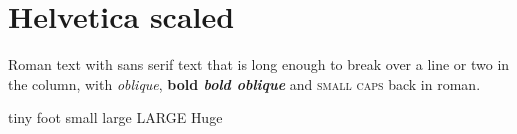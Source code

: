 \documentclass[10pt]{article}
\begin{document}
\section{Helvetica scaled}
Roman text with {\sffamily sans serif text that is long enough to break over a line or two in the column, with
{\itshape oblique}, {\bfseries bold \slshape bold oblique} and {\scshape small caps}} back in roman.

{\sffamily\tiny tiny} {\sffamily\footnotesize foot} {\sffamily\small small} {\sffamily\large large} {\sffamily\LARGE LARGE} {\sffamily\Huge Huge}
\end{document}
